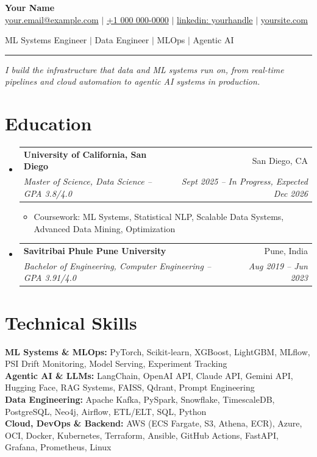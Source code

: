 \documentclass[letterpaper,10.5pt]{article}
\makeatletter
\newcommand{\resumeItem}[1]{
  \item\small{{#1 \vspace{-2pt}}}
}
\newcommand{\resumeSubheading}[4]{
  \vspace{-2pt}\item
    \begin{tabular*}{0.97\textwidth}[t]{l@{\extracolsep{\fill}}r}
      \textbf{#1} & #2 \\
      \textit{\small#3} & \textit{\small #4} \\
    \end{tabular*}\vspace{-6pt}
}
\newcommand{\resumeSubHeadingListStart}{\begin{itemize}[leftmargin=0.15in, label={}]}
\newcommand{\resumeSubHeadingListEnd}{\end{itemize}}
\newcommand{\resumeItemListStart}{\begin{itemize}}
\newcommand{\resumeItemListEnd}{\end{itemize}\vspace{-4pt}}
\makeatother
\begin{document}
\begin{center}
    {\LARGE \textbf{Your Name}}\\
    \vspace{4pt}
    \small
    \href{mailto:your.email@example.com}{your.email@example.com} $|$
    \href{tel:+10000000000}{+1 000 000-0000} $|$
    \href{https://www.linkedin.com/in/yourhandle/}{linkedin: yourhandle} $|$
    \href{https://yoursite.com}{yoursite.com}
\end{center}
\begin{center}
    \normalsize ML Systems Engineer $|$ Data Engineer $|$ MLOps $|$ Agentic AI
\end{center}
\vspace{-3pt}
\noindent\rule{\textwidth}{1.5pt}
\vspace{2pt}
\noindent\small\textit{I build the infrastructure that data and ML systems run on, from real-time pipelines and cloud automation to agentic AI systems in production.}
\vspace{-4pt}

\section{Education}
  \resumeSubHeadingListStart
    \resumeSubheading
      {University of California, San Diego}{San Diego, CA}
      {Master of Science, Data Science -- GPA 3.8/4.0}{Sept 2025 -- In Progress, Expected Dec 2026}
      \resumeItemListStart
        \resumeItem{Coursework: ML Systems, Statistical NLP, Scalable Data Systems, Advanced Data Mining, Optimization}
      \resumeItemListEnd
    \vspace{5pt}
    \resumeSubheading
      {Savitribai Phule Pune University}{Pune, India}
      {Bachelor of Engineering, Computer Engineering -- GPA 3.91/4.0}{Aug 2019 -- Jun 2023}
  \resumeSubHeadingListEnd

\section{Technical Skills}
 \begin{itemize}[leftmargin=0.15in, label={}]
    \small{\item{
     \textbf{ML Systems \& MLOps:} PyTorch, Scikit-learn, XGBoost, LightGBM, MLflow, PSI Drift Monitoring, Model Serving, Experiment Tracking \\[2pt]
     \textbf{Agentic AI \& LLMs:} LangChain, OpenAI API, Claude API, Gemini API, Hugging Face, RAG Systems, FAISS, Qdrant, Prompt Engineering \\[2pt]
     \textbf{Data Engineering:} Apache Kafka, PySpark, Snowflake, TimescaleDB, PostgreSQL, Neo4j, Airflow, ETL/ELT, SQL, Python \\[2pt]
     \textbf{Cloud, DevOps \& Backend:} AWS (ECS Fargate, S3, Athena, ECR), Azure, OCI, Docker, Kubernetes, Terraform, Ansible, GitHub Actions, FastAPI, Grafana, Prometheus, Linux
    }}
 \end{itemize}
\end{document}
